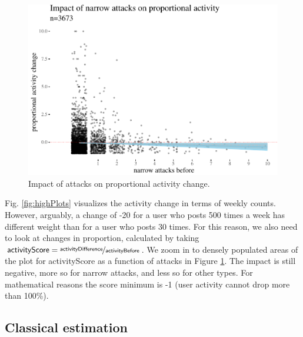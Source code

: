 \documentclass[
  10pt,
  dvipsnames]{scrartcl}
\begin{document}
\begin{figure}[H]

\begin{center}\includegraphics[width=1\linewidth]{testPatrycja_files/figure-latex/unnamed-chunk-7-1} \end{center}
\caption{Impact of attacks  on proportional activity change.}
\label{fig:propActivity}
\end{figure}

Fig. \ref{fig:highPlots} visualizes the activity change in terms of
weekly counts. However, arguably, a change of -20 for a user who posts
500 times a week has different weight than for a user who posts 30
times. For this reason, we also need to look at changes in proportion,
calculated by taking
\(\mathsf{activityScore} = \nicefrac{\mathsf{activityDifference}}{\mathsf{activityBefore}}\).
We zoom in to densely populated areas of the plot for
\textsf{activityScore} as a function of attacks in Figure
\ref{fig:propActivity}. The impact is still negative, more so for
\textsf{narrow} attacks, and less so for other types. For mathematical
reasons the score minimum is -1 (user activity cannot drop more than
100\%).

\subsection{Classical estimation}
\end{document}
